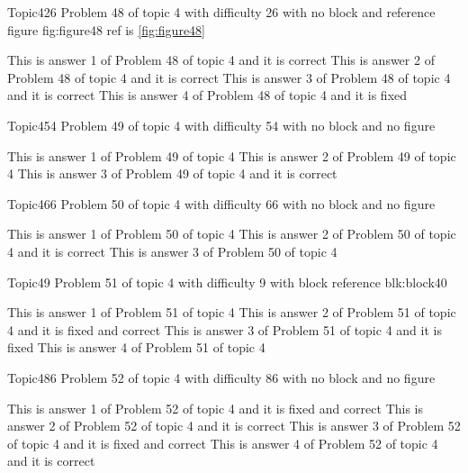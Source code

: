 \documentclass[master]{exam}
\begin{document}
\begin{problem}{Topic4}{26}
	Problem 48 of topic 4 with difficulty 26 with no block and reference figure fig:figure48 ref is \ref{fig:figure48}
	\begin{answers}
		\answer[correct] This is answer 1 of Problem 48 of topic 4 and it is correct
		\answer[correct] This is answer 2 of Problem 48 of topic 4 and it is correct
		\answer[correct] This is answer 3 of Problem 48 of topic 4 and it is correct
		\answer[fixed] This is answer 4 of Problem 48 of topic 4 and it is fixed
	\end{answers}
\end{problem}

\begin{problem}{Topic4}{54}
	Problem 49 of topic 4 with difficulty 54 with no block and no figure
	\begin{answers}
		\answer This is answer 1 of Problem 49 of topic 4 
		\answer This is answer 2 of Problem 49 of topic 4 
		\answer[correct] This is answer 3 of Problem 49 of topic 4 and it is correct
	\end{answers}
\end{problem}

\begin{problem}{Topic4}{66}
	Problem 50 of topic 4 with difficulty 66 with no block and no figure
	\begin{answers}
		\answer This is answer 1 of Problem 50 of topic 4 
		\answer[correct] This is answer 2 of Problem 50 of topic 4 and it is correct
		\answer This is answer 3 of Problem 50 of topic 4 
	\end{answers}
\end{problem}

\begin{problem}[requires=blk:block40]{Topic4}{9}
	Problem 51 of topic 4 with difficulty 9 with block reference blk:block40
	\begin{answers}
		\answer This is answer 1 of Problem 51 of topic 4 
		 This is answer 2 of Problem 51 of topic 4 and it is fixed and correct
		\answer[fixed] This is answer 3 of Problem 51 of topic 4 and it is fixed
		\answer This is answer 4 of Problem 51 of topic 4 
	\end{answers}
\end{problem}

\begin{problem}{Topic4}{86}
	Problem 52 of topic 4 with difficulty 86 with no block and no figure
	\begin{answers}
		 This is answer 1 of Problem 52 of topic 4 and it is fixed and correct
		\answer[correct] This is answer 2 of Problem 52 of topic 4 and it is correct
		 This is answer 3 of Problem 52 of topic 4 and it is fixed and correct
		\answer[correct] This is answer 4 of Problem 52 of topic 4 and it is correct
	\end{answers}
\end{problem}
\end{document}
